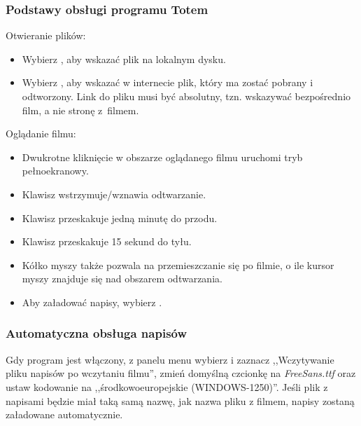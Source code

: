 \subsubsection{Podstawy obsługi programu Totem}
Otwieranie plików:
\begin{itemize}
\item Wybierz , aby wskazać plik na lokalnym dysku.
\item Wybierz , aby wskazać w internecie plik, który ma zostać pobrany i odtworzony. Link do pliku musi być absolutny, tzn. wskazywać bezpośrednio film, a nie stronę z~filmem.
\end{itemize}
Oglądanie filmu:
\begin{itemize}
\item Dwukrotne kliknięcie w obszarze oglądanego filmu uruchomi tryb pełnoekranowy.
\item Klawisz \keys{\Space} wstrzymuje/wznawia odtwarzanie.
\item Klawisz \keys{\arrowkeyright} przeskakuje jedną minutę do przodu.
\item Klawisz \keys{\arrowkeyleft} przeskakuje 15 sekund do tyłu.
\item Kółko myszy także pozwala na przemieszczanie się po filmie, o ile kursor myszy znajduje się nad obszarem odtwarzania.
\item Aby załadować napisy, wybierz .
\end{itemize}

\subsubsection{Automatyczna obsługa napisów}
Gdy program jest włączony, z panelu menu wybierz  i zaznacz ,,Wczytywanie pliku napisów po wczytaniu filmu'', zmień domyślną czcionkę na \textit{FreeSans.ttf} oraz ustaw kodowanie na ,,środkowoeuropejskie (WINDOWS-1250)''. Jeśli plik z napisami będzie miał taką samą nazwę, jak nazwa pliku z filmem, napisy zostaną załadowane automatycznie.
\clearpage

